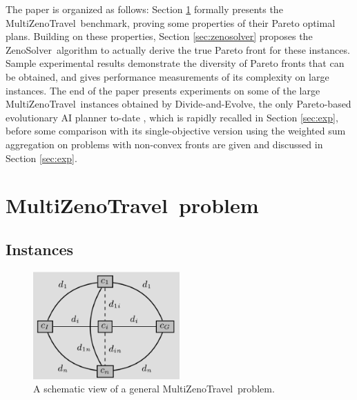 \documentclass{llncs}
\def\MULTIZENO{{\sc MultiZenoTravel}}
\def\ZENOSOLVER{{\sc ZenoSolver}}
\begin{document}
The paper is organized as follows: Section \ref{sec:multizeno} formally presents the  \MULTIZENO\ benchmark, proving some properties of their Pareto optimal plans. Building on these properties, Section \ref{sec:zenosolver} proposes the \ZENOSOLVER\ algorithm to actually derive the true Pareto front for these instances. Sample experimental results demonstrate the diversity of Pareto fronts that can be obtained, and gives performance measurements of its complexity on large instances. The end of the paper presents experiments on some of the large \MULTIZENO\ instances obtained by Divide-and-Evolve, the only Pareto-based evolutionary AI planner to-date \cite{IJCAI2013}, which is rapidly recalled in Section \ref{sec:exp}, before some comparison with its single-objective version using the weighted sum aggregation on problems with non-convex fronts are given and discussed in Section \ref{sec:exp}.

\section{\MULTIZENO\ problem}
\label{sec:multizeno}
\subsection{Instances}

\begin{figure}
\centering
% 
%  
%  
%     
%  
\includegraphics[width=0.5\textwidth]{abstractZeno.eps}
\caption{\label{fig.instance}A schematic view of a general \MULTIZENO\ problem. }
\end{figure}
\end{document}

